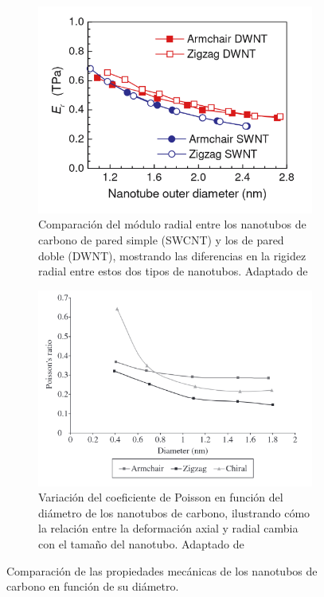 \documentclass[a4paper]{article}
\begin{document}
\begin{figure}[htbp]
\begin{subfigure}[b]{0.45\textwidth}
    \label{fig:subfig2}
  \end{subfigure}
  \\
  \begin{subfigure}[b]{0.45\textwidth}
    \centering
    \includegraphics[width=\textwidth]{images/Radial module.png}
    \caption{Comparación del módulo radial entre los nanotubos de carbono de pared simple (SWCNT) y los de pared doble (DWNT), mostrando las diferencias en la rigidez radial entre estos dos tipos de nanotubos. Adaptado de \cite{li2006modeling}}
    \label{fig:subfig3}
  \end{subfigure}
  \hfill
  \begin{subfigure}[b]{0.45\textwidth}
    \centering
    \includegraphics[width=\textwidth]{images/poisson-ratio.png}
    \caption{Variación del coeficiente de Poisson en función del diámetro de los nanotubos de carbono, ilustrando cómo la relación entre la deformación axial y radial cambia con el tamaño del nanotubo. Adaptado de \cite{avila2008molecular} }
    \label{fig:subfig4}
  \end{subfigure}
  \caption{Comparación de las propiedades mecánicas de los nanotubos de carbono en función de su diámetro.}
  \label{fig:subfiguras}
\end{figure} 
\end{document}
